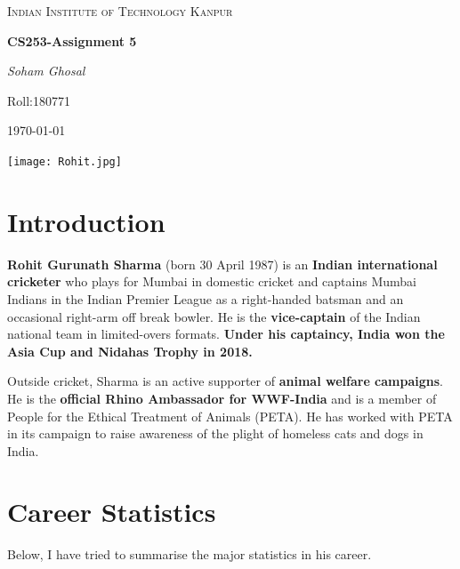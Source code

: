 \documentclass[twoside,10pt,a4paper]{article}
\numberwithin{equation}{section}
\numberwithin{figure}{section}
\begin{document}
\selectfont
\begin{titlepage}			
	\centering
	{\scshape\LARGE Indian Institute of Technology Kanpur\par}
	\vspace{1cm}
	{\huge\bfseries CS253-Assignment 5\par}
	\vspace{1cm}
	{\Large\itshape Soham Ghosal\par}	
	\vspace{1cm}
	\begin{center}
	    Roll:180771
	\end{center}
	\vspace{1cm}
	{\large \today\par}
	\vspace{3cm}
	\texttt{[image: Rohit.jpg]}
\end{titlepage}
\section{Introduction}\label{sec:section1}			
\textbf{Rohit Gurunath Sharma} (born 30 April 1987) is an \textbf{Indian international cricketer} who plays for Mumbai in domestic cricket and captains Mumbai Indians in the Indian Premier League as a right-handed batsman and an occasional right-arm off break bowler. He is the \textbf{vice-captain} of the Indian national team in limited-overs formats. \textbf{Under his captaincy, India won the Asia Cup and Nidahas Trophy in 2018.} \par
Outside cricket, Sharma is an active supporter of \textbf{animal welfare campaigns}. He is the \textbf{official Rhino Ambassador for WWF-India} and is a member of People for the Ethical Treatment of Animals (PETA). He has worked with PETA in its campaign to raise awareness of the plight of homeless cats and dogs in India.
\section{Career Statistics}
Below, I have tried to summarise the major statistics in his career.
\end{document}
